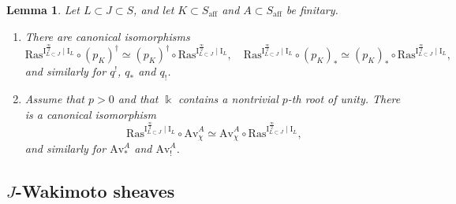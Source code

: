 \documentclass[11pt]{amsart}
\numberwithin{equation}{section}
\theoremstyle{plain}
\newtheorem{lem}[thm]{Lemma}
\theoremstyle{definition}
\newcommand{\F}{{\mathbb F}}
\newcommand{\I}{{\mathrm I}}
\renewcommand{\k}{\Bbbk}
\newcommand{\K}{{\mathbb K}}
\newcommand{\sL}{{\mathcal L}}
\newcommand{\semi}{{{\frac{\infty}{2}}}}
\newcommand{\quar}{{{\frac{\infty}{4}}}}
\newcommand{\oblv}{\mathrm{oblv}}
\newcommand{\Av}{\mathrm{Av}}
\newcommand{\af}{\mathrm{aff}}
\newcommand{\Shv}{\mathsf{Shv}}
\newcommand{\Ras}{\mathrm{Ras}}
\newcommand{\Fl}{\mathrm{Fl}}
\newcommand{\tFl}{\widetilde{\Fl}}
\newcommand{\Iu}{\mathrm{I}_{\mathrm{u}}}
\begin{document}
\begin{lem}
\label{lem:Av-Ras}
Let $L \subset J\subset S$, and let $K \subset S_\af$ and $A \subset S_\af$ be finitary. 
\begin{enumerate}
\item
\label{it:Av-Ras-1}
There are canonical isomorphisms
\[
\Ras^{\I_{L \subset J}^\semi \mid \I_L} \circ (p_K)^\dag \simeq (p_K)^\dag \circ \Ras^{\I_{L \subset J}^\semi \mid \I_L}, \quad
\Ras^{\I_{L \subset J}^\semi \mid \I_L} \circ (p_K)_* \simeq (p_K)_* \circ \Ras^{\I_{L \subset J}^\semi \mid \I_L},
\]
and similarly for $q^!$, $q_*$ and $q_!$.
\item 
\label{it:Av-Ras-2}
Assume that $p>0$ and that $\k$ contains a nontrivial $p$-th root of unity. There is a canonical isomorphism
\[
\Ras^{\I_{L \subset J}^{\semi} \mid \I_L} \circ \Av^A_{\chi} \simeq \Av^A_{\chi} \circ \Ras^{\I_{L \subset J}^{\semi} \mid \I_L}, 
\]
and similarly for $\Av^A_*$ and $\Av^A_!$.
\end{enumerate}
\end{lem}

\subsection{\texorpdfstring{$J$}{J}-Wakimoto sheaves}
\label{sss:Wakimoto}
\end{document}
